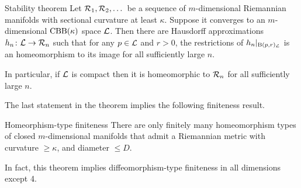 \begin{thm}{Stability theorem}\label{thm:stability}
Let $\mathcal{R}_1,\mathcal{R}_2,\dots $ be a sequence of $m$-dimensional Riemannian manifolds with sectional curvature at least $\kappa$.
Suppose it converges to an $m$-dimensional $\mathrm{CBB}(\kappa)$ space $\mathcal{L}$.
Then there are Hausdorff approximations $h_n\colon\mathcal{L}\to \mathcal{R}_n$ such that for any $p\in\mathcal{L}$ and $r>0$, the restrictions of $h_n|_{\mathrm{B}{}(p,r)_{\mathcal{L}}}$ is an homeomorphism to its image for all sufficiently large $n$.  

In particular, if $\mathcal{L}$ is compact then it is homeomorphic to $\mathcal{R}_n$ for all  sufficiently large $n$.
\end{thm}

The last statement in the theorem implies the following finiteness result.

\begin{thm}{Homeorphism-type finiteness}
There are only finitely many homeomorphism types of closed $m$-dimensional manifolds that admit a Riemannian metric with curvature $\ge \kappa$, and diameter $\le D$.
\end{thm}

In fact, this theorem implies diffeomorphism-type finiteness in all dimensions except 4.
